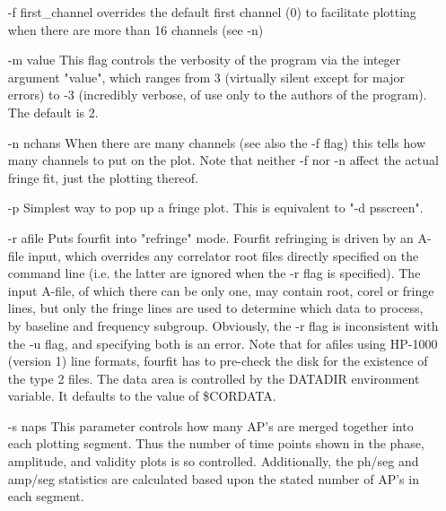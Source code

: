 \begin{itemize}
\item[-f first\_channel]
            overrides the default first channel (0) to facilitate
            plotting when there are more than 16 channels (see -n)

\item[-m value]
            This flag controls the verbosity of the program via
            the integer argument "value", which ranges from 3
            (virtually silent except for major errors) to -3 
            (incredibly verbose, of use only to the authors of 
            the program).  The default is 2.

\item[-n nchans]
            When there are many channels (see also the -f flag)
            this tells how many channels to put on the plot. Note
            that neither -f nor -n affect the actual fringe fit,
            just the plotting thereof.

\item[-p]
            Simplest way to pop up a fringe plot.
            This is equivalent to "-d psscreen".

\item[-r afile]
            Puts fourfit into "refringe" mode.  Fourfit refringing
            is driven by an A-file input, which overrides any 
            correlator root files directly specified on the command
            line (i.e. the latter are ignored when the -r flag
            is specified).  The input A-file, of which there can
            be only one, may contain root, corel or fringe lines,
            but only the fringe lines are used to determine which
            data to process, by baseline and frequency subgroup.
            Obviously, the -r flag is inconsistent with the -u
            flag, and specifying both is an error.  Note that for
            afiles using HP-1000 (version 1) line formats, fourfit
            has to pre-check the disk for the existence of the 
            type 2 files.  The data area is controlled by the
            DATADIR environment variable.  It defaults to the
            value of \$CORDATA.

\item[-s naps]
            This parameter controls how many AP's are merged
            together into each plotting segment. Thus the number
            of time points shown in the phase, amplitude, and
            validity plots is so controlled. Additionally, the
            ph/seg and amp/seg statistics are calculated based
            upon the stated number of AP's in each segment.


\end{itemize}
